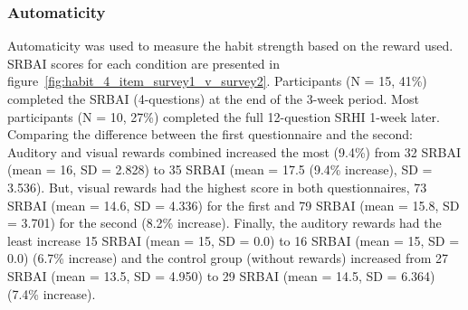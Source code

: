 \documentclass{scaffold/sigchi}
\begin{document}
\subsubsection{Automaticity}
Automaticity was used to measure the habit strength based on the reward used. SRBAI scores for each condition are presented in figure~\ref{fig:habit_4_item_survey1_v_survey2}.
Participants (N = 15, 41\%) completed the SRBAI (4-questions) at the end of the 3-week period. Most participants (N = 10, 27\%) completed the full 12-question SRHI 1-week later. Comparing the difference between the first questionnaire and the second: Auditory and visual rewards combined increased the most (9.4\%) from 32 SRBAI (mean = 16, SD = 2.828) to 35 SRBAI (mean = 17.5 (9.4\% increase), SD = 3.536). But, visual rewards had the highest score in both questionnaires, 73 SRBAI (mean = 14.6, SD = 4.336) for the first and 79 SRBAI (mean = 15.8, SD = 3.701) for the second (8.2\% increase). Finally, the auditory rewards had the least increase 15 SRBAI (mean = 15, SD = 0.0) to 16 SRBAI (mean = 15, SD = 0.0) (6.7\% increase) and the control group (without rewards) increased from 27 SRBAI (mean = 13.5, SD = 4.950) to 29 SRBAI (mean = 14.5, SD = 6.364) (7.4\% increase).

\end{document}
